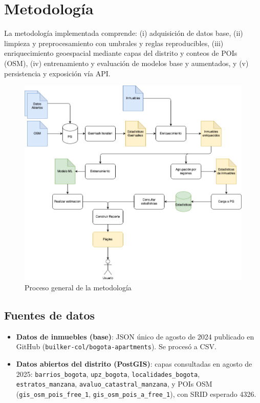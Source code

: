 \section*{Metodología}
La metodología implementada comprende: (i) adquisición de datos base, (ii) limpieza y preprocesamiento con umbrales y reglas reproducibles, (iii) enriquecimiento geoespacial mediante capas del distrito y conteos de POIs (OSM), (iv) entrenamiento y evaluación de modelos base y aumentados, y (v) persistencia y exposición vía API.

\begin{figure}[h]
    \centering
    \includegraphics[width=0.85\linewidth]{Images/metodologia.png}
    \caption{Proceso general de la metodología}
    \label{fig:metodologia}
\end{figure}

\subsection*{Fuentes de datos}
\begin{itemize}
    \item \textbf{Datos de inmuebles (base)}: JSON único de agosto de 2024 publicado en GitHub (\texttt{builker-col/bogota-apartments}). Se procesó a CSV.
    \item \textbf{Datos abiertos del distrito (PostGIS)}: capas consultadas en agosto de 2025: \texttt{barrios\_bogota}, \texttt{upz\_bogota}, \texttt{localidades\_bogota}, \texttt{estratos\_manzana}, \texttt{avaluo\_catastral\_manzana}, y POIs OSM (\texttt{gis\_osm\_pois\_free\_1}, \texttt{gis\_osm\_pois\_a\_free\_1}), con SRID esperado 4326.
\end{itemize}

